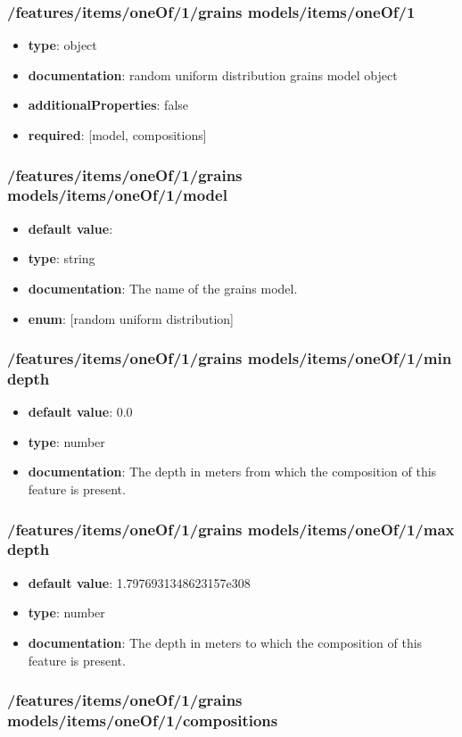 \subsubsection{/features/items/oneOf/1/grains models/items/oneOf/1}
\begin{itemize}\item {\bf type}: object
\item {\bf documentation}: random uniform distribution grains model object
\item {\bf additionalProperties}: false
\item {\bf required}: [model, compositions]\end{itemize}
\subsubsection{/features/items/oneOf/1/grains models/items/oneOf/1/model}
\begin{itemize}\item {\bf default value}: 
\item {\bf type}: string
\item {\bf documentation}: The name of the grains model.
\item {\bf enum}: [random uniform distribution]\end{itemize}\subsubsection{/features/items/oneOf/1/grains models/items/oneOf/1/min depth}
\begin{itemize}\item {\bf default value}: 0.0
\item {\bf type}: number
\item {\bf documentation}: The depth in meters from which the composition of this feature is present.
\end{itemize}\subsubsection{/features/items/oneOf/1/grains models/items/oneOf/1/max depth}
\begin{itemize}\item {\bf default value}: 1.7976931348623157e308
\item {\bf type}: number
\item {\bf documentation}: The depth in meters to which the composition of this feature is present.
\end{itemize}\subsubsection{/features/items/oneOf/1/grains models/items/oneOf/1/compositions}
